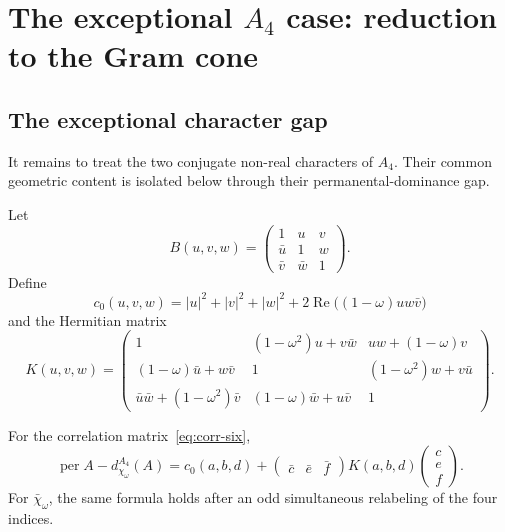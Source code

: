 \documentclass[10pt,twoside]{siamart1116}
\newcommand{\per}{\operatorname{per}}
\newcommand{\Rea}{\operatorname{Re}}
\newcommand{\mat}[1]{\begin{pmatrix}#1\end{pmatrix}}
\begin{document}
\section{The exceptional \texorpdfstring{$A_4$}{A4} case: reduction to the Gram cone}
\label{sec:a4-geometry}

\subsection{The exceptional character gap}

It remains to treat the two conjugate non-real characters of $A_4$.  Their
common geometric content is isolated below through their
permanental-dominance gap.

Let
\begin{equation}\label{eq:Buvw}
 B(u,v,w)=\mat{1&u&v\\\bar u&1&w\\\bar v&\bar w&1}.
\end{equation}
Define
\begin{equation}\label{eq:c0}
 c_0(u,v,w)=|u|^2+|v|^2+|w|^2
 +2\Rea\bigl((1-\omega)uw\bar v\bigr)
\end{equation}
and the Hermitian matrix
\begin{equation}\label{eq:K}
 K(u,v,w)=
 \mat{
 1&(1-\omega^2)u+v\bar w&uw+(1-\omega)v\\
 (1-\omega)\bar u+w\bar v&1&(1-\omega^2)w+v\bar u\\
 \bar u\bar w+(1-\omega^2)\bar v&(1-\omega)\bar w+u\bar v&1
 }.
\end{equation}

\begin{lemma}\label{lem:a4-expansion}
For the correlation matrix~\eqref{eq:corr-six},
\begin{equation}\label{eq:a4-gap}
 \per A-d_{\chi_\omega}^{A_4}(A)
 =c_0(a,b,d)+\mat{\bar c&\bar e&\bar f}
 K(a,b,d)\mat{c\\e\\f}.
\end{equation}
For $\bar\chi_\omega$, the same formula holds after an odd simultaneous
relabeling of the four indices.
\end{lemma}
\end{document}
